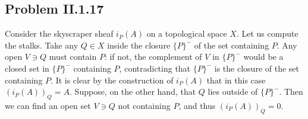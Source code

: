 \documentclass{mathnotes}
\begin{document}
\subsection*{Problem II.1.17}
Consider the skyscraper sheaf $i_P(A)$ on a topological space $X$. Let us compute the stalks. Take any $Q\in X$ inside the
closure $\{P\}^-$ of the set containing $P$. Any open $V\ni Q$ must contain $P$: if not, the complement of $V$ in $\{P\}^-$ would
be a closed set in $\{P\}^-$ containing $P$, contradicting that $\{P\}^-$ is the closure of the set containing $P$. It is
clear by the construction of $i_P(A)$ that in this case $(i_P(A))_Q=A$. Suppose, on the other hand, that $Q$ lies outside
of $\{P\}^-$. Then we can find an open set $V\ni Q$ not containing $P$, and thus $(i_P(A))_Q=0$.
\end{document}
